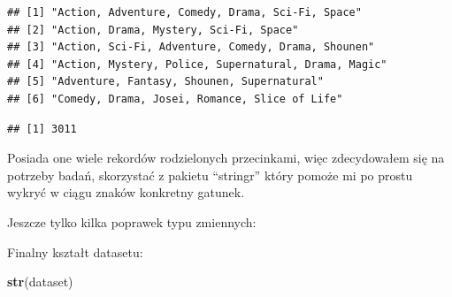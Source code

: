\documentclass[
]{article}
\newenvironment{Shaded}{\begin{snugshade}}{\end{snugshade}}
\newcommand{\FunctionTok}[1]{\textcolor[rgb]{0.13,0.29,0.53}{\textbf{#1}}}
\newcommand{\NormalTok}[1]{#1}
\newcommand{\OtherTok}[1]{\textcolor[rgb]{0.56,0.35,0.01}{#1}}
\newcommand{\SpecialCharTok}[1]{\textcolor[rgb]{0.81,0.36,0.00}{\textbf{#1}}}
\begin{document}
\begin{verbatim}
## [1] "Action, Adventure, Comedy, Drama, Sci-Fi, Space"    
## [2] "Action, Drama, Mystery, Sci-Fi, Space"              
## [3] "Action, Sci-Fi, Adventure, Comedy, Drama, Shounen"  
## [4] "Action, Mystery, Police, Supernatural, Drama, Magic"
## [5] "Adventure, Fantasy, Shounen, Supernatural"          
## [6] "Comedy, Drama, Josei, Romance, Slice of Life"
\end{verbatim}

\begin{Shaded}
\end{Shaded}

\begin{verbatim}
## [1] 3011
\end{verbatim}

Posiada one wiele rekordów rodzielonych przecinkami, więc zdecydowałem
się na potrzeby badań, skorzystać z pakietu ``stringr'' który pomoże mi
po prostu wykryć w ciągu znaków konkretny gatunek.

Jeszcze tylko kilka poprawek typu zmiennych:

\begin{Shaded}
\end{Shaded}

Finalny kształt datasetu:

\begin{Shaded}
\begin{Highlighting}[]
\FunctionTok{str}\NormalTok{(dataset)}
\end{Highlighting}
\end{Shaded}
\end{document}
